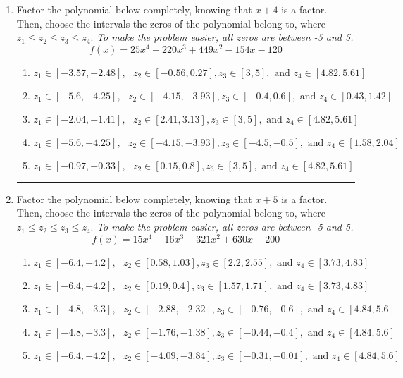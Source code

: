 \documentclass[14pt]{extbook}
\newcommand{\litem}[1]{\item#1\hspace*{-1cm}\rule{\textwidth}{0.4pt}}
\begin{document}
\begin{enumerate}
{\begin{enumerate}[label=\Alph*.]
\end{enumerate} }
\litem{
Factor the polynomial below completely, knowing that $x+4$ is a factor. Then, choose the intervals the zeros of the polynomial belong to, where $z_1 \leq z_2 \leq z_3 \leq z_4$. \textit{To make the problem easier, all zeros are between -5 and 5.}\[ f(x) = 25x^{4} +220 x^{3} +449 x^{2} -154 x -120 \]\begin{enumerate}[label=\Alph*.]
\item \( z_1 \in [-3.57, -2.48], \text{   }  z_2 \in [-0.56, 0.27], z_3 \in [3, 5], \text{   and   } z_4 \in [4.82, 5.61] \)
\item \( z_1 \in [-5.6, -4.25], \text{   }  z_2 \in [-4.15, -3.93], z_3 \in [-0.4, 0.6], \text{   and   } z_4 \in [0.43, 1.42] \)
\item \( z_1 \in [-2.04, -1.41], \text{   }  z_2 \in [2.41, 3.13], z_3 \in [3, 5], \text{   and   } z_4 \in [4.82, 5.61] \)
\item \( z_1 \in [-5.6, -4.25], \text{   }  z_2 \in [-4.15, -3.93], z_3 \in [-4.5, -0.5], \text{   and   } z_4 \in [1.58, 2.04] \)
\item \( z_1 \in [-0.97, -0.33], \text{   }  z_2 \in [0.15, 0.8], z_3 \in [3, 5], \text{   and   } z_4 \in [4.82, 5.61] \)

\end{enumerate} }
\litem{
Factor the polynomial below completely, knowing that $x+5$ is a factor. Then, choose the intervals the zeros of the polynomial belong to, where $z_1 \leq z_2 \leq z_3 \leq z_4$. \textit{To make the problem easier, all zeros are between -5 and 5.}\[ f(x) = 15x^{4} -16 x^{3} -321 x^{2} +630 x -200 \]\begin{enumerate}[label=\Alph*.]
\item \( z_1 \in [-6.4, -4.2], \text{   }  z_2 \in [0.58, 1.03], z_3 \in [2.2, 2.55], \text{   and   } z_4 \in [3.73, 4.83] \)
\item \( z_1 \in [-6.4, -4.2], \text{   }  z_2 \in [0.19, 0.4], z_3 \in [1.57, 1.71], \text{   and   } z_4 \in [3.73, 4.83] \)
\item \( z_1 \in [-4.8, -3.3], \text{   }  z_2 \in [-2.88, -2.32], z_3 \in [-0.76, -0.6], \text{   and   } z_4 \in [4.84, 5.6] \)
\item \( z_1 \in [-4.8, -3.3], \text{   }  z_2 \in [-1.76, -1.38], z_3 \in [-0.44, -0.4], \text{   and   } z_4 \in [4.84, 5.6] \)
\item \( z_1 \in [-6.4, -4.2], \text{   }  z_2 \in [-4.09, -3.84], z_3 \in [-0.31, -0.01], \text{   and   } z_4 \in [4.84, 5.6] \)

\end{enumerate} }
\end{enumerate}
\end{document}
